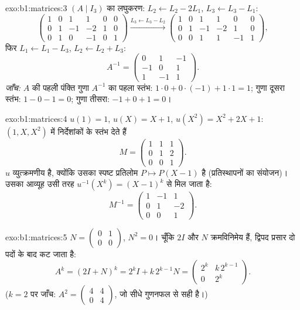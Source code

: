 \begin{solution}{exo:b1:matrices:3}
$(A \mid I_3)$ का लघुकरण: $L_2 \leftarrow L_2 - 2L_1$, $L_3 \leftarrow L_3 -
L_1$:
\[
\begin{pmatrix}
1 & 0 & 1 & 1 & 0 & 0\\
0 & 1 & -1 & -2 & 1 & 0\\
0 & 1 & 0 & -1 & 0 & 1
\end{pmatrix}
\xrightarrow{L_3 \leftarrow L_3 - L_2}
\begin{pmatrix}
1 & 0 & 1 & 1 & 0 & 0\\
0 & 1 & -1 & -2 & 1 & 0\\
0 & 0 & 1 & 1 & -1 & 1
\end{pmatrix},
\]
फिर $L_1 \leftarrow L_1 - L_3$, $L_2 \leftarrow L_2 + L_3$:
\[
A^{-1} = \begin{pmatrix}
0 & 1 & -1\\
-1 & 0 & 1\\
1 & -1 & 1
\end{pmatrix}.
\]
\emph{जाँच:} $A$ की पहली पंक्ति गुणा $A^{-1}$ का पहला स्तंभ: $1 \cdot 0 +
0\cdot(-1) + 1\cdot 1 = 1$; गुणा दूसरा स्तंभ: $1 - 0 - 1 = 0$; गुणा तीसरा:
$-1 + 0 + 1 = 0$।
\end{solution}

\begin{solution}{exo:b1:matrices:4}
$u(1) = 1$, $u(X) = X + 1$, $u(X^2) = X^2 + 2X + 1$: $(1, X, X^2)$ में
निर्देशांकों के स्तंभ देते हैं
\[
M = \begin{pmatrix}
1 & 1 & 1\\
0 & 1 & 2\\
0 & 0 & 1
\end{pmatrix}.
\]
$u$ व्युत्क्रमणीय है, क्योंकि उसका स्पष्ट प्रतिलोम $P \mapsto P(X - 1)$ है
(प्रतिस्थापनों का संयोजन)। उसका आव्यूह उसी तरह $u^{-1}(X^k) = (X-1)^k$ से
मिल जाता है:
\[
M^{-1} = \begin{pmatrix}
1 & -1 & 1\\
0 & 1 & -2\\
0 & 0 & 1
\end{pmatrix}.
\]
\end{solution}

\begin{solution}{exo:b1:matrices:5}
$N = \begin{pmatrix} 0 & 1\\ 0 & 0\end{pmatrix}$, $N^2 = 0$। चूँकि $2I$ और
$N$ क्रमविनिमेय हैं, द्विपद प्रसार दो पदों के बाद कट जाता है:
\[
A^k = (2I + N)^k = 2^k I + k\,2^{k-1} N
= \begin{pmatrix} 2^k & k\,2^{k-1}\\ 0 & 2^k\end{pmatrix}.
\]
($k = 2$ पर जाँच: $A^2 = \begin{pmatrix}4 & 4\\ 0 & 4\end{pmatrix}$, जो सीधे
गुणनफल से सही है।)
\end{solution}

